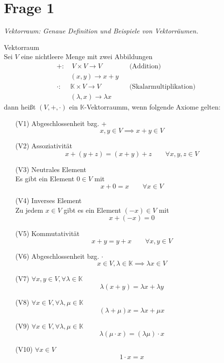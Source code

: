 \section{Frage 1}
\textit{Vektorraum: Genaue Definition und Beispiele von Vektorräumen.}
\begin{definition}
    Vektorraum\\
    Sei $V$ eine nichtleere Menge mit zwei Abbildungen
    \begin{align*}
        +: &\ V \times V \to V &&\text{(Addition)}\\
        & (x,y) \to x+y\\
        \cdot :\ & \mathbb{K} \times V \to V &&\text{(Skalarmultiplikation)}\\
        & (\lambda, x)\to \lambda x
    \end{align*}
    dann heißt $(V, +, \cdot)$ ein $\mathbb{K}$-Vektorraumm, wenn folgende Axiome gelten:
    \begin{enumerate}
        \item[(V1)] Abgeschlossenheit bzg. +
        \[
            x,y\in V \implies x + y\in V
        \]
        \item[(V2)] Assoziativität
        \[
            x + (y + z) = (x + y) + z\qquad \forall x,y,z\in V
        \]
        \item[(V3)] Neutrales Element\\
        Es gibt ein Element $0\in V$ mit
        \[
            x + 0 = x\qquad \forall x\in V
        \]
        \item[(V4)] Inverses Element\\
        Zu jedem $x\in V$ gibt es ein Element $(-x)\in V$ mit
        \[
            x + (-x) = 0
        \]
        \item[(V5)] Kommutativität
        \[
            x+y = y+x\qquad \forall x,y\in V
        \]
        \item[(V6)] Abgeschlossenheit bzg. $\cdot$
        \[
            x\in V, \lambda \in \mathbb{K}\implies \lambda x \in V
        \]
        \item[(V7)] $\forall x,y\in V, \forall \lambda \in \mathbb{K}$
        \[
            \lambda(x+y)= \lambda x + \lambda y
        \]
        \item[(V8)] $\forall x \in V, \forall \lambda, \mu \in \mathbb{K}$
        \[
            (\lambda + \mu)x = \lambda x + \mu x
        \]
        \item[(V9)] $\forall x \in V, \forall \lambda,\mu\in\mathbb{K}$
        \[
            \lambda(\mu\cdot x) = (\lambda\mu)\cdot x
        \]
        \item[(V10)] $\forall x\in V$
        \[
            1 \cdot x = x
        \]
    \end{enumerate}
\end{definition}
